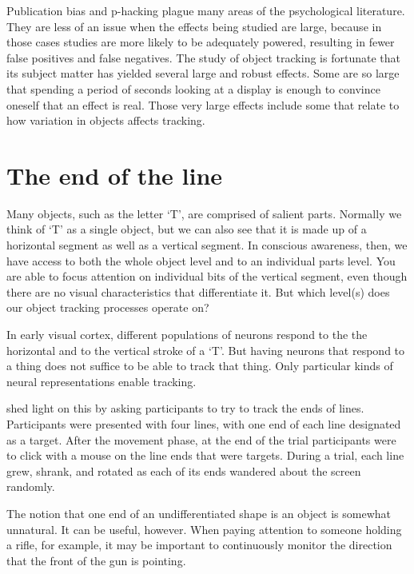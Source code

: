 \documentclass[
]{book}
\begin{document}
Publication bias and p-hacking plague many areas of the psychological literature. They are less of an issue when the effects being studied are large, because in those cases studies are more likely to be adequately powered, resulting in fewer false positives and false negatives. The study of object tracking is fortunate that its subject matter has yielded several large and robust effects. Some are so large that spending a period of seconds looking at a display is enough to convince oneself that an effect is real. Those very large effects include some that relate to how variation in objects affects tracking.

\hypertarget{the-end-of-the-line}{%
\section{The end of the line}\label{the-end-of-the-line}}

Many objects, such as the letter `T', are comprised of salient parts. Normally we think of `T' as a single object, but we can also see that it is made up of a horizontal segment as well as a vertical segment. In conscious awareness, then, we have access to both the whole object level and to an individual parts level. You are able to focus attention on individual bits of the vertical segment, even though there are no visual characteristics that differentiate it. But which level(s) does our object tracking processes operate on?

In early visual cortex, different populations of neurons respond to the the horizontal and to the vertical stroke of a `T'. But having neurons that respond to a thing does not suffice to be able to track that thing. Only particular kinds of neural representations enable tracking.

\citet{schollWhatVisualObject2001} shed light on this by asking participants to try to track the ends of lines. Participants were presented with four lines, with one end of each line designated as a target. After the movement phase, at the end of the trial participants were to click with a mouse on the line ends that were targets. During a trial, each line grew, shrank, and rotated as each of its ends wandered about the screen randomly.

The notion that one end of an undifferentiated shape is an object is somewhat unnatural. It can be useful, however. When paying attention to someone holding a rifle, for example, it may be important to continuously monitor the direction that the front of the gun is pointing.
\end{document}
